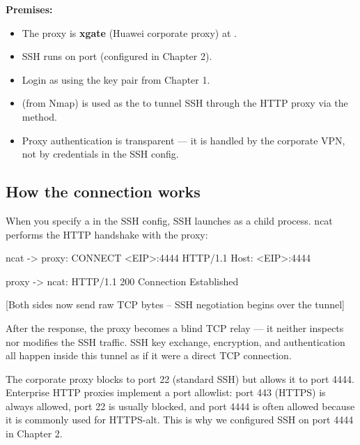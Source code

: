 \documentclass{guide}
\begin{document}
\begin{infobox}
\textbf{Premises:}
\begin{itemize}
  \item The proxy is \textbf{xgate} (Huawei corporate proxy) at
        .
  \item SSH runs on port  (configured in Chapter 2).
  \item Login as  using the key pair from Chapter 1.
  \item {} (from Nmap) is used as the 
        to tunnel SSH through the HTTP proxy via the  method.
  \item Proxy authentication is transparent --- it is handled by the corporate
        VPN, not by credentials in the SSH config.
\end{itemize}
\end{infobox}

\subsection{How the connection works}

When you specify a  in the SSH config, SSH launches
 as a child process. ncat performs the HTTP 
handshake with the proxy:

\begin{code}
ncat -> proxy:   CONNECT <EIP>:4444 HTTP/1.1
                 Host: <EIP>:4444

proxy -> ncat:   HTTP/1.1 200 Connection Established

[Both sides now send raw TCP bytes -- SSH negotiation begins over the tunnel]
\end{code}

After the  response, the proxy becomes a
blind TCP relay --- it neither inspects nor modifies the SSH traffic. SSH key
exchange, encryption, and authentication all happen inside this tunnel as if it
were a direct TCP connection.

\begin{infobox}
The corporate proxy blocks  to port 22 (standard SSH) but
allows it to port 4444. Enterprise HTTP proxies implement a 
port allowlist: port 443 (HTTPS) is always allowed, port 22 is usually blocked,
and port 4444 is often allowed because it is commonly used for HTTPS-alt. This
is why we configured SSH on port 4444 in Chapter 2.
\end{infobox}
\end{document}
